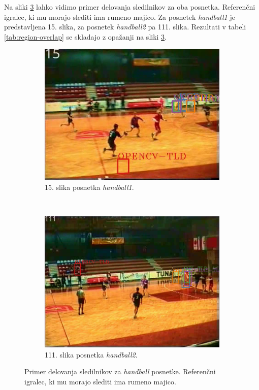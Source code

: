 Na sliki \ref{fig:tracker-visual} lahko vidimo primer delovanja sledilnikov za oba posnetka. Referenčni igralec, ki mu morajo slediti ima rumeno majico. Za posnetek \textit{handball1} je predstavljena 15. slika, za posnetek \textit{handball2} pa 111. slika. Rezultati v tabeli \ref{tab:region-overlap} se skladajo z opažanji na sliki \ref{fig:tracker-visual}.

\begin{figure}[htb]
\centering

	\begin{subfigure}[t]{0.45\columnwidth}
      \includegraphics[width=\columnwidth]{./Slike/handball1-example.png}
      \caption{15. slika posnetka \textit{handball1}.}
      \label{fig:handball1}
    \end{subfigure}
    ~
    \begin{subfigure}[t]{0.45\columnwidth}
      \includegraphics[width=\columnwidth]{./Slike/handball2-example.png}
      \caption{111. slika posnetka \textit{handball2}.}
      \label{fig:handball2}
    \end{subfigure}  
\caption[Primer delovanja sledilnikov za \textit{handball} posnetke]{Primer delovanja sledilnikov za \textit{handball} posnetke. Referenčni igralec, ki mu morajo slediti ima rumeno majico. }
\label{fig:tracker-visual}
\end{figure}




